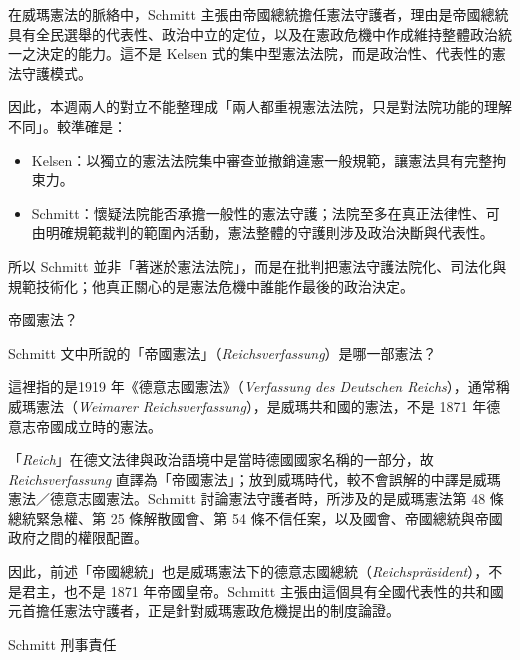 在威瑪憲法的脈絡中，Schmitt 主張由帝國總統擔任憲法守護者，理由是帝國總統具有全民選舉的代表性、政治中立的定位，以及在憲政危機中作成維持整體政治統一之決定的能力。這不是 Kelsen 式的集中型憲法法院，而是政治性、代表性的憲法守護模式。

因此，本週兩人的對立不能整理成「兩人都重視憲法法院，只是對法院功能的理解不同」。較準確是：

\begin{itemize}
\tightlist
\item
  Kelsen：以獨立的憲法法院集中審查並撤銷違憲一般規範，讓憲法具有完整拘束力。
\item
  Schmitt：懷疑法院能否承擔一般性的憲法守護；法院至多在真正法律性、可由明確規範裁判的範圍內活動，憲法整體的守護則涉及政治決斷與代表性。
\end{itemize}

所以 Schmitt 並非「著迷於憲法法院」，而是在批判把憲法守護法院化、司法化與規範技術化；他真正關心的是憲法危機中誰能作最後的政治決定。


\begin{qaprompt}
帝國憲法？
\end{qaprompt}

\begin{qaquestion}
Schmitt 文中所說的「帝國憲法」（\emph{Reichsverfassung}）是哪一部憲法？
\end{qaquestion}

這裡指的是1919 年《德意志國憲法》（\emph{Verfassung des Deutschen Reichs}），通常稱威瑪憲法（\emph{Weimarer Reichsverfassung}），是威瑪共和國的憲法，不是 1871 年德意志帝國成立時的憲法。

「\emph{Reich}」在德文法律與政治語境中是當時德國國家名稱的一部分，故 \emph{Reichsverfassung} 直譯為「帝國憲法」；放到威瑪時代，較不會誤解的中譯是威瑪憲法／德意志國憲法。Schmitt 討論憲法守護者時，所涉及的是威瑪憲法第 48 條總統緊急權、第 25 條解散國會、第 54 條不信任案，以及國會、帝國總統與帝國政府之間的權限配置。

因此，前述「帝國總統」也是威瑪憲法下的德意志國總統（\emph{Reichspräsident}），不是君主，也不是 1871 年帝國皇帝。Schmitt 主張由這個具有全國代表性的共和國元首擔任憲法守護者，正是針對威瑪憲政危機提出的制度論證。


\begin{qaprompt}
Schmitt 刑事責任
\end{qaprompt}


